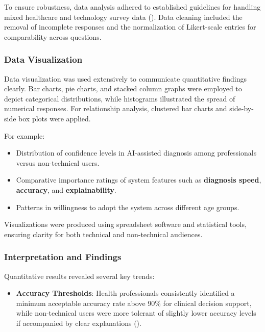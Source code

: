 \documentclass[
  12pt,
  oneside]{article}
\providecommand{\tightlist}{%
  \setlength{\itemsep}{0pt}\setlength{\parskip}{0pt}}
\begin{document}
To ensure robustness, data analysis adhered to established guidelines
for handling mixed healthcare and technology survey data
(). Data cleaning
included the removal of incomplete responses and the normalization of
Likert-scale entries for comparability across questions.

\subsubsection{Data Visualization}\label{data-visualization}

Data visualization was used extensively to communicate quantitative
findings clearly. Bar charts, pie charts, and stacked column graphs were
employed to depict categorical distributions, while histograms
illustrated the spread of numerical responses. For relationship
analysis, clustered bar charts and side-by-side box plots were applied.

For example:

\begin{itemize}
\tightlist
\item
  Distribution of confidence levels in AI-assisted diagnosis among
  professionals versus non-technical users.
\item
  Comparative importance ratings of system features such as
  \textbf{diagnosis speed}, \textbf{accuracy}, and
  \textbf{explainability}.
\item
  Patterns in willingness to adopt the system across different age
  groups.
\end{itemize}

Visualizations were produced using spreadsheet software and statistical
tools, ensuring clarity for both technical and non-technical audiences.

\subsubsection{Interpretation and
Findings}\label{interpretation-and-findings}

Quantitative results revealed several key trends:

\begin{itemize}
\tightlist
\item
  \textbf{Accuracy Thresholds}: Health professionals consistently
  identified a minimum acceptable accuracy rate above 90\% for clinical
  decision support, while non-technical users were more tolerant of
  slightly lower accuracy levels if accompanied by clear explanations
  ().
\end{itemize}
\end{document}
